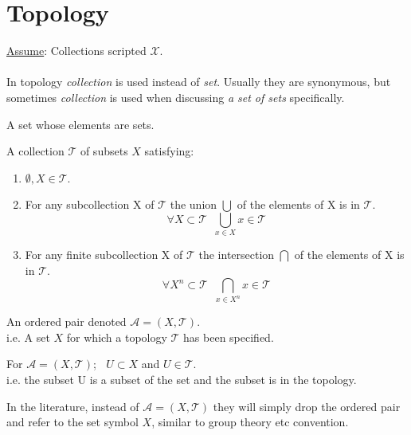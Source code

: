 \chapter{Topology}
\underline{Assume}: Collections scripted $\mathscr{X}$. \\
\\
In topology \textit{collection} is used instead of \textit{set}. Usually they are synonymous, but sometimes \textit{collection} is used when discussing \textit{a set of sets} specifically. \\
\begin{defn}
	A set whose elements are sets.
\end{defn}
\begin{defn}[Topology]
	A collection $\mathscr{T}$ of subsets $X$ satisfying:
	\begin{enumerate}
		\item $\emptyset, X \in \mathscr{T}$.
		\item For any subcollection X of $\mathscr{T}$ the union $\bigcup$ of the elements of X is in $\mathscr{T}$.
		\[\forall X \subset \mathscr{T} \; \; \bigcup_{x \in X} x \in \mathscr{T} \]
		\item For any finite subcollection X of $\mathscr{T}$ the intersection $\bigcap$ of the elements of X is in $\mathscr{T}$.
		\[ \forall {X}^{n} \subset \mathscr{T} \; \; \bigcap_{x \in {X}^{n} } x \in \mathscr{T} \]
	\end{enumerate}
\end{defn}
\begin{defn}
	An ordered pair denoted $\mathscr{A} = (X, \mathscr{T})$. \\
	i.e. A set $X$ for which a topology $\mathscr{T}$ has been specified.
\end{defn}
\begin{defn}
	For $\mathscr{A} = (X, \mathscr{T})$;  $\; \; U \subset X$ and $U \in \mathscr{T}$. \\
	i.e. the subset U is a subset of the set and the subset is in the topology.
\end{defn}
In the literature, instead of $\mathscr{A} = (X, \mathscr{T})$ they will simply drop the ordered pair and refer to the set symbol $X$, similar to group theory etc convention.